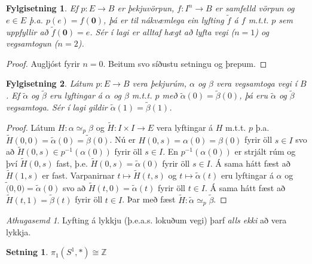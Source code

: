 \documentclass[a4paper,icelandic]{book}
\theoremstyle{definition}
\theoremstyle{plain}
\newtheorem{setn}{Setning}[section]
\newtheorem{fylgisetn}{Fylgisetning}[section]
\theoremstyle{remark}
\newtheorem*{ath}{Athugasemd}
\newcommand{\Z}{\mathbb{Z}} %
\begin{document}
\begin{fylgisetn}\label{fylgisetn:lyft1}
  Ef $p:E\to B$ er þekjuvörpun, $f:I^n\to B$ er samfelld vörpun og $e\in
  E$ þ.a. $p(e) = f(\mathbf 0)$, þá er til nákvæmlega ein lyfting
  $\tilde f$ á $f$ m.t.t. $p$ sem uppfyllir að $\tilde f(\mathbf 0) =
  e$. Sér í lagi er alltaf hægt að lyfta vegi ($n = 1$) og vegsamtogun
  ($n=2$).
\end{fylgisetn}
\begin{proof}
  Augljóst fyrir $n=0$. Beitum svo síðustu setningu og þrepum.
\end{proof}
\begin{fylgisetn}\label{fylgisetn:lyft2}
  Látum $p:E\to B$ vera þekjurúm, $\alpha$ og $\beta$ vera vegsamtoga
  vegi í $B$. Ef $\tilde\alpha$ og $\tilde\beta$ eru lyftingar á
  $\alpha$ og $\beta$ m.t.t. $p$ með $\tilde\alpha(0)=\tilde\beta(0)$,
  þá eru $\tilde\alpha$ og $\tilde\beta$ vegsamtoga. Sér í lagi gildir
  $\tilde\alpha(1)=\tilde\beta(1)$.
\end{fylgisetn}
\begin{proof}
  Látum $H:\alpha\simeq_p\beta$ og $\tilde H:I\times I\to E$ vera
  lyftingar á $H$ m.t.t. $p$ þ.a. $\tilde
  H(0,0)=\tilde\alpha(0)=\tilde\beta(0)$. Nú er
  $H(0,s)=\alpha(0)=\beta(0)$ fyrir öll $s\in I$ svo að $\tilde
  H(0,s)\in p^{-1}(\alpha(0))$ fyrir öll $s\in I$. En
  $p^{-1}(\alpha(0))$ er strjált rúm og því $\tilde H(0,s)$ fast, þ.e.
  $\tilde H(0,s)=\tilde\alpha(0)$ fyrir öll $s\in I$. Á sama hátt fæst
  að $\tilde H(1,s)$ er fast. Varpanirnar $t\mapsto\tilde H(t,s)$ og 
  $t\mapsto\tilde\alpha(t)$ eru lyftingar á $\alpha$ og
  $\tilde(0,0)=\tilde\alpha(0)$ svo að $\tilde H(t,0)=\tilde\alpha(t)$
  fyrir öll $t\in I$. Á sama hátt fæst að $\tilde H(t,1)=\tilde\beta(t)$
  fyrir öll $t\in I$. Þar með fæst $\tilde
  H:\tilde\alpha\simeq_p\tilde\beta$.
\end{proof}
\begin{ath}
  Lyfting á lykkju (þ.e.a.s. lokuðum vegi) þarf \emph{alls ekki} að vera
  lykkja.
\end{ath}
\begin{setn}
  $\pi_1(S^1,*)\cong\Z$
\end{setn}
\end{document}
